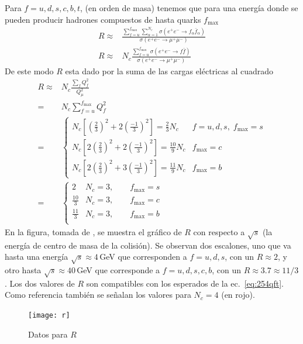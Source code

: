 Para $f=u,d,s,c,b,t$, (en orden de masa) tenemos que para una energía donde se pueden producir hadrones compuestos de hasta  quarks $f_{\text{max}}$
\begin{align}
  R\approx&\frac{\sum_{f=u}^{f_{\text{max}}}\sum_{\alpha=1}^{N_c}\sigma(e^+e^-\to f_\alpha\bar{f}_\alpha)}{\sigma(e^+e^-\to\mu^+\mu^-)}\nonumber\\
  R\approx&N_c\frac{\sum_{f=u}^{f_{\text{max}}}\sigma(e^+e^-\to f\bar{f})}{\sigma(e^+e^-\to\mu^+\mu^-)}
\end{align}
De este modo $R$ esta dado por la suma de las cargas eléctricas al cuadrado
\begin{align}
\label{eq:254qft}
R\approx&N_c\frac{\sum_f Q_f^2}{Q_\mu^2}\nonumber\\
=&N_c\sum_{f=u}^{f_{\text{max}}} Q_f^2\nonumber\\
=&
\begin{cases}
  N_c[(\frac{2}{3})^2+2(\frac{-1}{3})^2]=\frac{2}{3}N_c&f=u,d,s,\;f_{\text{max}}=s\\
  N_c[2(\frac{2}{3})^2+2(\frac{-1}{3})^2]=\frac{10}{9}N_c&f_{\text{max}}=c\\
  N_c[2(\frac{2}{3})^2+3(\frac{-1}{3})^2]=\frac{11}{9}N_c&f_{\text{max}}=b
\end{cases}\nonumber\\
=&
\begin{cases}
  2&N_c=3,\qquad f_{\text{max}}=s\\
  \frac{10}{3}&N_c=3,\qquad f_{\text{max}}=c\\
  \frac{11}{3}&N_c=3,\qquad f_{\text{max}}=b\\
\end{cases}
\end{align}
En la figura, tomada de \cite{a}, se muestra el gráfico de $R$ con respecto a $\sqrt{s}$ (la energía de centro de masa de la colisión). Se observan dos escalones, uno que va hasta una energía $\sqrt{s}\approx4\,$GeV que corresponden a $f=u,d,s$, con un $R\approx2$,  y otro hasta $\sqrt{s}\approx40\,$GeV que corresponde a $f=u,d,s,c,b$, con un $R\approx3.7\approx11/3$. Los dos valores de $R$ son compatibles con los esperados de la ec.~\eqref{eq:254qft}. Como referencia también se señalan los valores para $N_c=4$ (en rojo). 
\begin{figure}
  \centering
  \texttt{[image: r]}
  \caption{Datos para $R$}
  \label{fig:r}
\end{figure}

